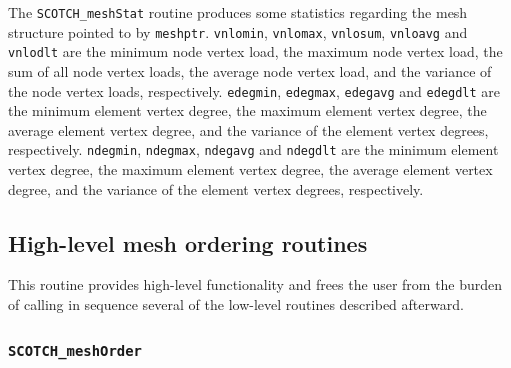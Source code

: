 \begin{itemize}
\progdes

The {\tt SCOTCH\_meshStat} routine produces some statistics regarding
the mesh structure pointed to by {\tt meshptr}.
{\tt vnlomin}, {\tt vnlomax}, {\tt vnlosum}, {\tt vnloavg} and
{\tt vnlodlt} are the minimum node vertex load, the maximum node
vertex load, the sum of all node vertex loads, the average node
vertex load, and the variance of the node vertex loads, respectively.
{\tt edegmin}, {\tt edegmax}, {\tt edegavg} and
{\tt edegdlt} are the minimum element vertex degree, the maximum
element vertex degree, the average element vertex degree, and the
variance of the element vertex degrees, respectively.
{\tt ndegmin}, {\tt ndegmax}, {\tt ndegavg} and
{\tt ndegdlt} are the minimum element vertex degree, the maximum
element vertex degree, the average element vertex degree, and the
variance of the element vertex degrees, respectively.
\end{itemize}

\subsection{High-level mesh ordering routines}

This routine provides high-level functionality and frees the
user from the burden of calling in sequence several of the low-level
routines described afterward.

\subsubsection{{\tt SCOTCH\_meshOrder}}

